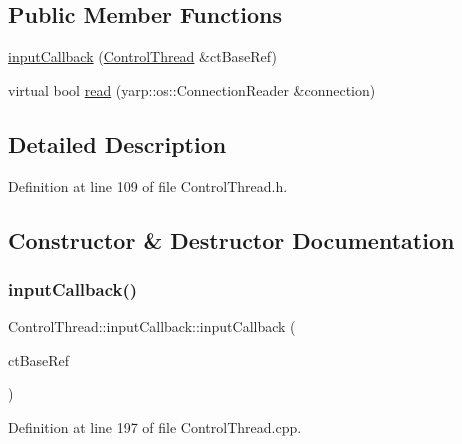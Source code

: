 \subsection*{Public Member Functions}
\begin{DoxyCompactItemize}
\item 
\hyperlink{classocra__recipes_1_1ControlThread_1_1inputCallback_a6dc341ad369c4c24c17932d525b98399}{input\+Callback} (\hyperlink{classocra__recipes_1_1ControlThread}{Control\+Thread} \&ct\+Base\+Ref)
\item 
virtual bool \hyperlink{classocra__recipes_1_1ControlThread_1_1inputCallback_a8c41c2ec6a86539d8bc0653fe79e3bec}{read} (yarp\+::os\+::\+Connection\+Reader \&connection)
\end{DoxyCompactItemize}


\subsection{Detailed Description}


Definition at line 109 of file Control\+Thread.\+h.



\subsection{Constructor \& Destructor Documentation}
\hypertarget{classocra__recipes_1_1ControlThread_1_1inputCallback_a6dc341ad369c4c24c17932d525b98399}{}\label{classocra__recipes_1_1ControlThread_1_1inputCallback_a6dc341ad369c4c24c17932d525b98399} 
\subsubsection{\texorpdfstring{input\+Callback()}{inputCallback()}}
{\footnotesize\ttfamily Control\+Thread\+::input\+Callback\+::input\+Callback (\begin{DoxyParamCaption}\item[{\hyperlink{classocra__recipes_1_1ControlThread}{Control\+Thread} \&}]{ct\+Base\+Ref }\end{DoxyParamCaption})}



Definition at line 197 of file Control\+Thread.\+cpp.



